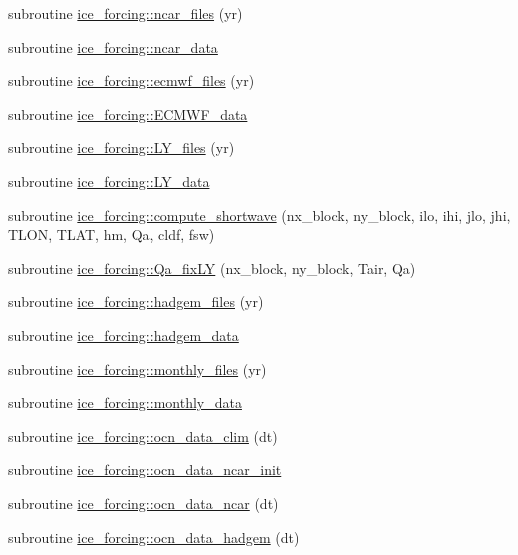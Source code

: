 \begin{DoxyCompactItemize}
\item 
subroutine \hyperlink{namespaceice__forcing_a18335b8937585695c3ddddd162b39414}{ice\_\-forcing::ncar\_\-files} (yr)
\item 
subroutine \hyperlink{namespaceice__forcing_a24793c87569906af2dce6abb1be1f204}{ice\_\-forcing::ncar\_\-data}
\item 
subroutine \hyperlink{namespaceice__forcing_adbed1e81d23690718cc666b6bb1c964e}{ice\_\-forcing::ecmwf\_\-files} (yr)
\item 
subroutine \hyperlink{namespaceice__forcing_a7d343f266bce5c9e7a7062d07fc3b57e}{ice\_\-forcing::ECMWF\_\-data}
\item 
subroutine \hyperlink{namespaceice__forcing_a4efb2f31dda4004f4fefadeac72d74a5}{ice\_\-forcing::LY\_\-files} (yr)
\item 
subroutine \hyperlink{namespaceice__forcing_af090b8a3141de745a9f1893256289b0b}{ice\_\-forcing::LY\_\-data}
\item 
subroutine \hyperlink{namespaceice__forcing_af98a1525343c579e040a9dfd3493ada4}{ice\_\-forcing::compute\_\-shortwave} (nx\_\-block, ny\_\-block, ilo, ihi, jlo, jhi, TLON, TLAT, hm, Qa, cldf, fsw)
\item 
subroutine \hyperlink{namespaceice__forcing_a72e60597f70954128768b0082b1a4579}{ice\_\-forcing::Qa\_\-fixLY} (nx\_\-block, ny\_\-block, Tair, Qa)
\item 
subroutine \hyperlink{namespaceice__forcing_a47009d309c3885ec335b6595792ffb39}{ice\_\-forcing::hadgem\_\-files} (yr)
\item 
subroutine \hyperlink{namespaceice__forcing_a39483ffb7ca71d3bc78cfb98b9dbbdbc}{ice\_\-forcing::hadgem\_\-data}
\item 
subroutine \hyperlink{namespaceice__forcing_a7a1e37c4eee269322492ab28f1e99737}{ice\_\-forcing::monthly\_\-files} (yr)
\item 
subroutine \hyperlink{namespaceice__forcing_aa45c8ecbe140ec4fa53e278301462374}{ice\_\-forcing::monthly\_\-data}
\item 
subroutine \hyperlink{namespaceice__forcing_a83eb2b44b9507b6136d8ca5969356058}{ice\_\-forcing::ocn\_\-data\_\-clim} (dt)
\item 
subroutine \hyperlink{namespaceice__forcing_aeb55eba5600676c3b7eb42cf02d337c1}{ice\_\-forcing::ocn\_\-data\_\-ncar\_\-init}
\item 
subroutine \hyperlink{namespaceice__forcing_a1b5cad2ae77729861f402fa1ef5a2140}{ice\_\-forcing::ocn\_\-data\_\-ncar} (dt)
\item 
subroutine \hyperlink{namespaceice__forcing_a6b38f04cff511ea4f70d58e89dfaf0e5}{ice\_\-forcing::ocn\_\-data\_\-hadgem} (dt)
\end{DoxyCompactItemize}

